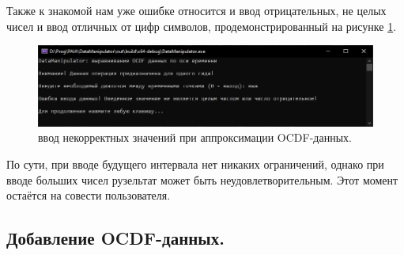 {\standartFont

  \par Также к знакомой нам уже ошибке относится и ввод отрицательных, не целых чисел и ввод отличных от цифр символов, продемонстрированный на рисунке \ref{fig:OCDFapprerr1}.

  \begin{figure}[H]
    \centering
    \includegraphics[width=\textwidth]{images/forDataManipulator/OCDFApprErr1.png}
    \caption{ввод некорректных значений при аппроксимации OCDF-данных.} 
    \label{fig:OCDFapprerr1}
  \end{figure}

  \par По сути, при вводе будущего интервала нет никаких ограничений, однако при вводе больших чисел рузельтат может быть неудовлетворительным. Этот момент остаётся на совести пользователя. 

  \par 
}

\subsection{ \standartTitleFont
  Добавление OCDF-данных.
} \label{subsec:OCDFAddData}

